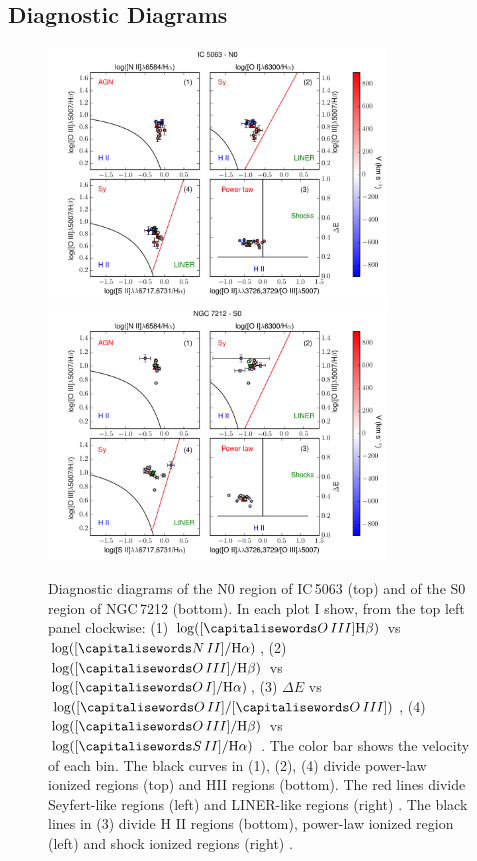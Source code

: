 \documentclass[../main.tex]{subfiles}
\begin{document}
\subsection{Diagnostic Diagrams}
\label{sec:diag}

\begin{figure} 
\centering
\includegraphics[width=0.8\textwidth]{images/paper1/IC5063_n0_diag.pdf}\\
\includegraphics[width=0.8\textwidth]{images/paper1/NGC7212_s0_diag.pdf}\\
\caption[]{Diagnostic diagrams of the N0 region of IC\,5063 (top) and of the S0 region of NGC\,7212 (bottom).  In each plot I show, from the top left panel clockwise: (1) $\log([\ion{O}{III}] \Hb)$ vs $\log([\ion{N}{II}]/ \Ha)$, (2) $\log([\ion{O}{III}]/ \Hb)$ vs $\log([\ion{O}{I}]/ \Ha)$, (3) $\Delta E$ vs $\log([\ion{O}{II}]/[\ion{O}{III}])$, (4) $\log([\ion{O}{III}]/ \Hb)$ vs $\log([\ion{S}{II}]/ \Ha)$ \citep{Baldwin81, Veilleux87}. The color bar shows the velocity of each bin. The black curves in (1), (2), (4) divide power-law ionized regions (top) and HII regions (bottom). The red lines divide Seyfert-like regions (left) and LINER-like regions (right) \citep{Kewley06}. The black lines in (3) divide H II regions (bottom), power-law ionized region (left) and shock ionized regions (right) \citep{Baldwin81}.  }
\label{fig:diag_es}
\end{figure}
\end{document}
